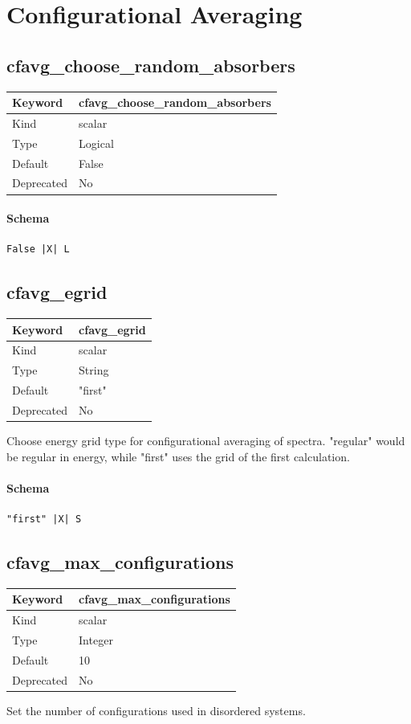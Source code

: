 \documentclass[11pt]{article}
\begin{document}
{{{{{\section{Configurational Averaging}

\subsection{cfavg\_choose\_random\_absorbers}
\label{kw:cfavg-choose-random-absorbers}
\begin{longtable}{|p{1.5in}|p{4.5in}|}
\hline
Keyword & cfavg\_choose\_random\_absorbers \\
\hline
Kind & scalar \\
\hline
Type & Logical \\
\hline
Default & False \\
\hline
Deprecated & No \\
\hline
\end{longtable}
\paragraph{Schema}
\begin{Verbatim}
False |X| L
\end{Verbatim}

\subsection{cfavg\_egrid}
\label{kw:cfavg-egrid}
\begin{longtable}{|p{1.5in}|p{4.5in}|}
\hline
Keyword & cfavg\_egrid \\
\hline
Kind & scalar \\
\hline
Type & String \\
\hline
Default & "first" \\
\hline
Deprecated & No \\
\hline
\end{longtable}
 Choose energy grid type for configurational
 averaging of spectra. "regular" would be
 regular in energy, while "first" uses
 the grid of the first calculation.

\paragraph{Schema}
\begin{Verbatim}
"first" |X| S
\end{Verbatim}

\subsection{cfavg\_max\_configurations}
\label{kw:cfavg-max-configurations}
\begin{longtable}{|p{1.5in}|p{4.5in}|}
\hline
Keyword & cfavg\_max\_configurations \\
\hline
Kind & scalar \\
\hline
Type & Integer \\
\hline
Default & 10 \\
\hline
Deprecated & No \\
\hline
\end{longtable}
 Set the number of configurations used in disordered systems.

}}}}}
\end{document}
